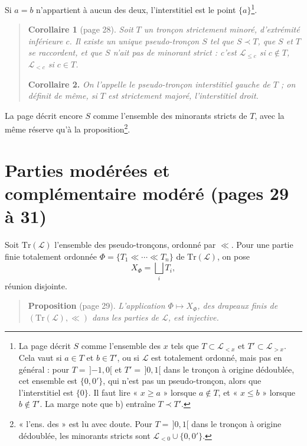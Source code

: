 \documentclass[11pt,a4paper]{article}
\begin{document}
\noindent Si $a = b$ n'appartient à aucun des deux, l'interstitiel est le point
$\{a\}$\footnote{La page décrit $S$ comme l'ensemble des $x$ tels que $T \subset
\mathcal{L}_{<x}$ et $T' \subset \mathcal{L}_{>x}$. Cela vaut si $a \in T$ et
$b \in T'$, ou si $\mathcal{L}$ est totalement ordonné, mais pas en général :
pour $T = \,]{-1}, 0[$ et $T' = \,]0, 1[$ dans le tronçon à origine dédoublée,
cet ensemble est $\{0, 0'\}$, qui n'est pas un pseudo-tronçon, alors que
l'interstitiel est $\{0\}$. Il faut lire « $x \geq a$ » lorsque $a \notin T$, et
« $x \leq b$ » lorsque $b \notin T'$. La marge note que b) entraîne $T \prec
T'$.}.

\begin{quote}
\textbf{Corollaire 1} (page 28). \emph{Soit $T$ un tronçon strictement minoré,
d'extrémité inférieure $c$. Il existe un unique pseudo-tronçon $S$ tel que $S
\prec T$, que $S$ et $T$ se raccordent, et que $S$ n'ait pas de minorant strict
: c'est $\mathcal{L}_{\leq c}$ si $c \notin T$, $\mathcal{L}_{<c}$ si $c \in
T$.}

\textbf{Corollaire 2.} \emph{On l'appelle le \emph{pseudo-tronçon interstitiel
gauche} de $T$ ; on définit de même, si $T$ est strictement majoré,
l'interstitiel droit.}
\end{quote}

\noindent La page décrit encore $S$ comme l'ensemble des minorants stricts de
$T$, avec la même réserve qu'à la proposition\footnote{« l'ens. des » est lu
avec doute. Pour $T = \,]0,1[$ dans le tronçon à origine dédoublée, les minorants
stricts sont $\mathcal{L}_{<0} \cup \{0, 0'\}$.}.

\section*{Parties modérées et complémentaire modéré (pages 29 à 31)}

Soit $\mathrm{Tr}(\mathcal{L})$ l'ensemble des pseudo-tronçons, ordonné par
$\ll$. Pour une partie finie totalement ordonnée $\Phi = \{T_{1} \ll \cdots \ll
T_{n}\}$ de $\mathrm{Tr}(\mathcal{L})$, on pose
\[
X_{\Phi} = \bigsqcup_{i} T_{i} ,
\]
réunion disjointe.

\begin{quote}
\textbf{Proposition} (page 29). \emph{L'application $\Phi \mapsto X_{\Phi}$, des
drapeaux finis de $(\mathrm{Tr}(\mathcal{L}), \ll)$ dans les parties de
$\mathcal{L}$, est injective.}
\end{quote}
\end{document}
